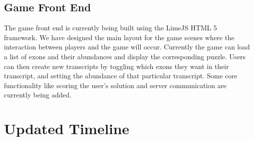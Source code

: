 \documentclass[12pt]{article}
\begin{document}
\subsection*{Game Front End}
The game front end is currently being built using the LimeJS HTML 5 framework. We have designed the main layout for the game scenes where the interaction between players and the game will occur. Currently the game can load a list of exons and their abundances and display the corresponding puzzle. Users can then create new transcripts by toggling which exons they want in their transcript, and setting the abundance of that particular transcript. Some core functionality like scoring the user's solution and 
server communication are currently being added.

\section*{Updated Timeline}
\end{document}
